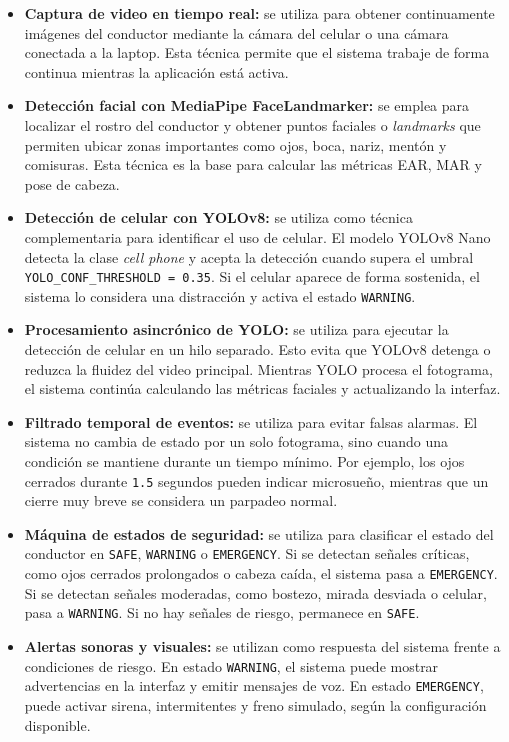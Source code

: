 \documentclass[conference]{IEEEtran}
\begin{document}
\begin{itemize}
    \item \textbf{Captura de video en tiempo real:} se utiliza para obtener continuamente imágenes del conductor mediante la cámara del celular o una cámara conectada a la laptop. Esta técnica permite que el sistema trabaje de forma continua mientras la aplicación está activa.

    \item \textbf{Detección facial con MediaPipe FaceLandmarker:} se emplea para localizar el rostro del conductor y obtener puntos faciales o \textit{landmarks} que permiten ubicar zonas importantes como ojos, boca, nariz, mentón y comisuras. Esta técnica es la base para calcular las métricas EAR, MAR y pose de cabeza.

    \item \textbf{Detección de celular con YOLOv8:} se utiliza como técnica complementaria para identificar el uso de celular. El modelo YOLOv8 Nano detecta la clase \textit{cell phone} y acepta la detección cuando supera el umbral \texttt{YOLO\_CONF\_THRESHOLD = 0.35}. Si el celular aparece de forma sostenida, el sistema lo considera una distracción y activa el estado \texttt{WARNING}.

    \item \textbf{Procesamiento asincrónico de YOLO:} se utiliza para ejecutar la detección de celular en un hilo separado. Esto evita que YOLOv8 detenga o reduzca la fluidez del video principal. Mientras YOLO procesa el fotograma, el sistema continúa calculando las métricas faciales y actualizando la interfaz.

    \item \textbf{Filtrado temporal de eventos:} se utiliza para evitar falsas alarmas. El sistema no cambia de estado por un solo fotograma, sino cuando una condición se mantiene durante un tiempo mínimo. Por ejemplo, los ojos cerrados durante \texttt{1.5} segundos pueden indicar microsueño, mientras que un cierre muy breve se considera un parpadeo normal.

    \item \textbf{Máquina de estados de seguridad:} se utiliza para clasificar el estado del conductor en \texttt{SAFE}, \texttt{WARNING} o \texttt{EMERGENCY}. Si se detectan señales críticas, como ojos cerrados prolongados o cabeza caída, el sistema pasa a \texttt{EMERGENCY}. Si se detectan señales moderadas, como bostezo, mirada desviada o celular, pasa a \texttt{WARNING}. Si no hay señales de riesgo, permanece en \texttt{SAFE}.

    \item \textbf{Alertas sonoras y visuales:} se utilizan como respuesta del sistema frente a condiciones de riesgo. En estado \texttt{WARNING}, el sistema puede mostrar advertencias en la interfaz y emitir mensajes de voz. En estado \texttt{EMERGENCY}, puede activar sirena, intermitentes y freno simulado, según la configuración disponible.
\end{itemize}
\end{document}
